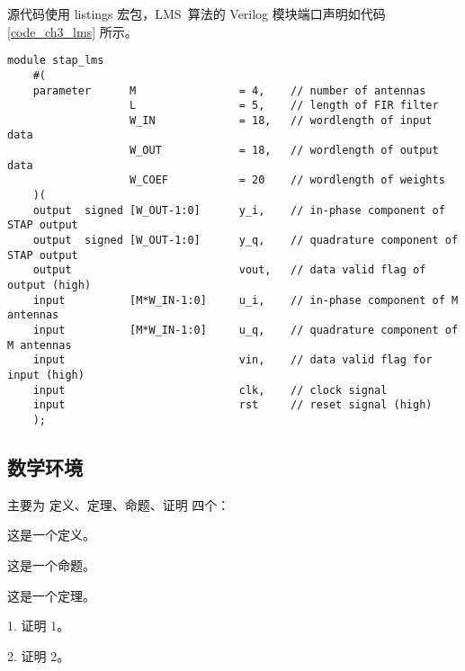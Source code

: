 源代码使用 listings 宏包，LMS~算法的 Verilog 模块端口声明如代码 \ref{code_ch3_lms} 所示。

{
    \begin{lstlisting}[caption={空时~LMS~算法~Verilog~模块端口声明},label={code_ch3_lms}]
    module stap_lms
    #(
    parameter      M                = 4,    // number of antennas
                   L                = 5,    // length of FIR filter
                   W_IN             = 18,   // wordlength of input data
                   W_OUT            = 18,   // wordlength of output data
                   W_COEF           = 20    // wordlength of weights
    )(
    output  signed [W_OUT-1:0]      y_i,    // in-phase component of STAP output
    output  signed [W_OUT-1:0]      y_q,    // quadrature component of STAP output
    output                          vout,   // data valid flag of output (high)
    input          [M*W_IN-1:0]     u_i,    // in-phase component of M antennas
    input          [M*W_IN-1:0]     u_q,    // quadrature component of M antennas
    input                           vin,    // data valid flag for input (high)
    input                           clk,    // clock signal
    input                           rst     // reset signal (high)
    );
    \end{lstlisting}
}

\subsection{数学环境}

主要为 定义、定理、命题、证明 四个：

\begin{Definition}
	这是一个定义。
\end{Definition}

\begin{Proposition}
	这是一个命题。
\end{Proposition}

\begin{Theorem}
	这是一个定理。
\end{Theorem}

\begin{Proof}
	1. 证明 1。

	2. 证明 2。
\end{Proof}
